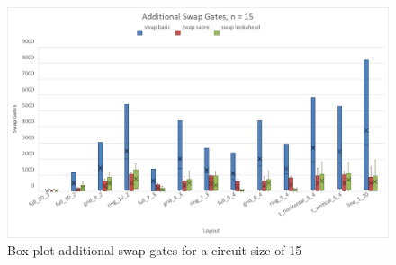 \begin{figure}[htb]
    \centering
    \includegraphics[width=0.9\linewidth]{image/chart_box_plot_swap.png}
    \caption{Box plot additional swap gates for a circuit size of 15}
    \label{fig:chart-box-plot-swap}
\end{figure}

